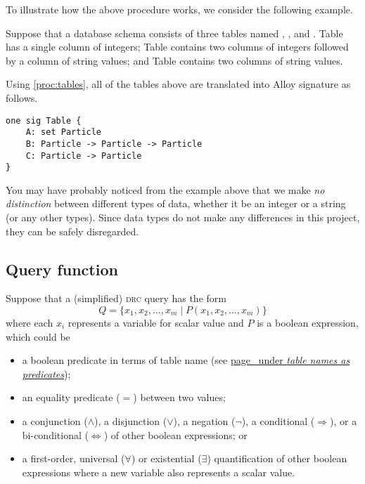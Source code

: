 To illustrate how the above procedure works, we consider the following example.

\smallskip
\begin{example}
    Suppose that a database schema consists of three tables named , , and . Table  has a single column of integers; Table  contains two columns of integers followed by a column of string values; and Table  contains two columns of string values.

    Using \autoref{proc:tables}, all of the tables above are translated into Alloy signature as follows.
\begin{lstlisting}[language=alloy,numbers=none]
one sig Table {
    A: set Particle
    B: Particle -> Particle -> Particle
    C: Particle -> Particle
}
\end{lstlisting}
\end{example}

\begin{note}
    You may have probably noticed from the example above that we make \emph{no distinction} between different types of data, whether it be an integer or a string (or any other types). Since data types do not make any differences in this project, they can be safely disregarded.
\end{note}


\subsection{Query function}

Suppose that a (simplified) \textsc{drc} query has the form
\begin{equation}
    Q = \{x_1,x_2,\ldots,x_m \mid P(x_1,x_2,\ldots,x_m)\} \label{eq:query}
\end{equation}
where each $x_i$ represents a variable for scalar value and $P$ is a boolean expression, which could be

\begin{itemize}[topsep=0.5pc,itemsep=0.25pc]
    \item  a boolean predicate in terms of table name (see \hyperref[psec:table-name-pred]{page~\pageref*{psec:table-name-pred} under \emph{table names as predicates}});
    \item  an equality predicate ($=$) between two values;
    \item  a conjunction ($\wedge$), a disjunction ($\vee$), a negation ($\neg$\hrsp), a conditional ($\Rightarrow$), or a bi-conditional ($\Leftrightarrow$) of other boolean expressions; or
    \item  a first-order, universal ($\forall$) or existential ($\exists$) quantification of other boolean expressions where a new variable also represents a scalar value.
\end{itemize}

